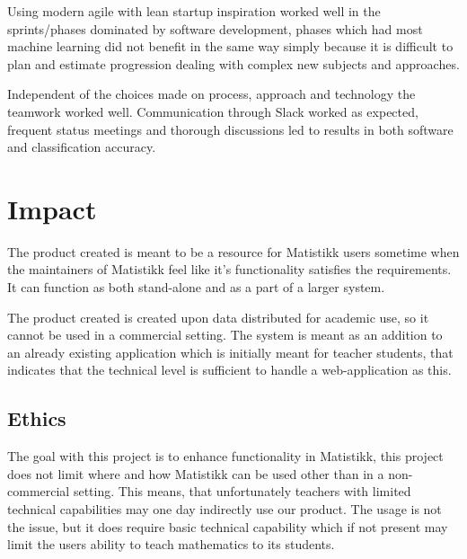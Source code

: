 Using modern agile with lean startup inspiration worked well in the sprints/phases dominated by software development, phases which had most machine learning did not benefit in the same way simply because it is difficult to plan and estimate progression dealing with complex new subjects and approaches.

Independent of the choices made on process, approach and technology the teamwork worked well. Communication through Slack worked as expected, frequent status meetings and thorough discussions led to results in both software and classification accuracy.



\section{Impact}


The product created is meant to be a resource for Matistikk users sometime when the maintainers of Matistikk feel like it's functionality satisfies the requirements. It can function as both stand-alone and as a part of a larger system.

The product created is created upon data distributed for academic use, so it cannot be used in a commercial setting. The system is meant as an addition to an already existing application which is initially meant for teacher students, that indicates that the technical level is sufficient to handle a web-application as this.

\subsection{Ethics}
The goal with this project is to enhance functionality in Matistikk, this project does not limit where and how Matistikk can be used other than in a non-commercial setting. This means, that unfortunately teachers with limited technical capabilities may one day indirectly use our product. The usage is not the issue, but it does require basic technical capability which if not present may limit the users ability to teach mathematics to its students.

